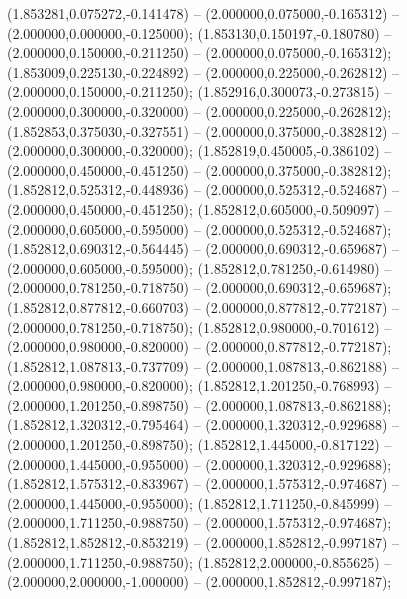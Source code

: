  (1.853281,0.075272,-0.141478) -- (2.000000,0.075000,-0.165312) -- (2.000000,0.000000,-0.125000);
 (1.853130,0.150197,-0.180780) -- (2.000000,0.150000,-0.211250) -- (2.000000,0.075000,-0.165312);
 (1.853009,0.225130,-0.224892) -- (2.000000,0.225000,-0.262812) -- (2.000000,0.150000,-0.211250);
 (1.852916,0.300073,-0.273815) -- (2.000000,0.300000,-0.320000) -- (2.000000,0.225000,-0.262812);
 (1.852853,0.375030,-0.327551) -- (2.000000,0.375000,-0.382812) -- (2.000000,0.300000,-0.320000);
 (1.852819,0.450005,-0.386102) -- (2.000000,0.450000,-0.451250) -- (2.000000,0.375000,-0.382812);
 (1.852812,0.525312,-0.448936) -- (2.000000,0.525312,-0.524687) -- (2.000000,0.450000,-0.451250);
 (1.852812,0.605000,-0.509097) -- (2.000000,0.605000,-0.595000) -- (2.000000,0.525312,-0.524687);
 (1.852812,0.690312,-0.564445) -- (2.000000,0.690312,-0.659687) -- (2.000000,0.605000,-0.595000);
 (1.852812,0.781250,-0.614980) -- (2.000000,0.781250,-0.718750) -- (2.000000,0.690312,-0.659687);
 (1.852812,0.877812,-0.660703) -- (2.000000,0.877812,-0.772187) -- (2.000000,0.781250,-0.718750);
 (1.852812,0.980000,-0.701612) -- (2.000000,0.980000,-0.820000) -- (2.000000,0.877812,-0.772187);
 (1.852812,1.087813,-0.737709) -- (2.000000,1.087813,-0.862188) -- (2.000000,0.980000,-0.820000);
 (1.852812,1.201250,-0.768993) -- (2.000000,1.201250,-0.898750) -- (2.000000,1.087813,-0.862188);
 (1.852812,1.320312,-0.795464) -- (2.000000,1.320312,-0.929688) -- (2.000000,1.201250,-0.898750);
 (1.852812,1.445000,-0.817122) -- (2.000000,1.445000,-0.955000) -- (2.000000,1.320312,-0.929688);
 (1.852812,1.575312,-0.833967) -- (2.000000,1.575312,-0.974687) -- (2.000000,1.445000,-0.955000);
 (1.852812,1.711250,-0.845999) -- (2.000000,1.711250,-0.988750) -- (2.000000,1.575312,-0.974687);
 (1.852812,1.852812,-0.853219) -- (2.000000,1.852812,-0.997187) -- (2.000000,1.711250,-0.988750);
 (1.852812,2.000000,-0.855625) -- (2.000000,2.000000,-1.000000) -- (2.000000,1.852812,-0.997187);
